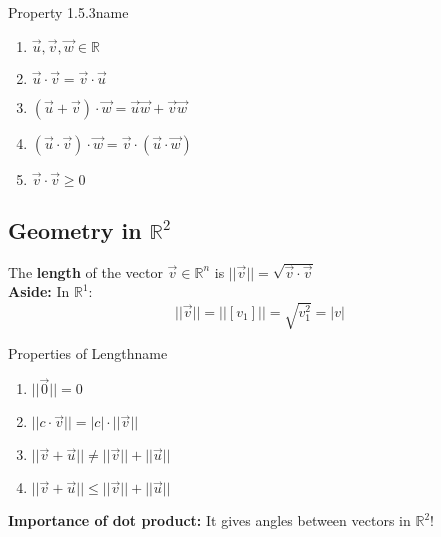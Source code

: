 \documentclass[11pt]{article}
\theoremstyle{plain}
\theoremstyle{remark}
\theoremstyle{plain}
\newcommand{\bd}{\textbf}
\newcommand{\rn}{\mathbb{R}}
\begin{document}
\begin{theo}{Property 1.5.3}{name}
    \begin{enumerate}
        \item $\overrightarrow{u},\overrightarrow{v}, \overrightarrow{w} \in \rn$
        \item $\overrightarrow{u}\cdot\overrightarrow{v} = \overrightarrow{v}\cdot\overrightarrow{u}$
        \item $(\overrightarrow{u}+\overrightarrow{v})\cdot\overrightarrow{w} = \overrightarrow{u}\overrightarrow{w}+\overrightarrow{v}\overrightarrow{w}$
        \item $(\overrightarrow{u}\cdot\overrightarrow{v})\cdot\overrightarrow{w} = \overrightarrow{v}\cdot(\overrightarrow{u}\cdot\overrightarrow{w})$
        \item $\overrightarrow{v}\cdot \overrightarrow{v}\geq 0$
    \end{enumerate}
\end{theo}

\subsection*{Geometry in $\rn^2$}
\begin{tcolorbox}[colback=green!5!white,colframe=green!75!black,title=Definition]
    The \bd{length} of the vector $\overrightarrow{v}\in \rn^n$ is $||\overrightarrow{v}|| = \sqrt{\overrightarrow{v}\cdot\overrightarrow{v}}$\\
    
    \bd{Aside:} In $\rn^1:$ \[||\overrightarrow{v}||=||[v_1]|| = \sqrt{v_1^2} = |v|\]
\end{tcolorbox}   
\begin{theo}{Properties of Length}{name}
    \begin{enumerate}
        \item $||\overrightarrow{0}|| = 0$
        \item $||c \cdot \overrightarrow{v}|| = |c|\cdot||\overrightarrow{v}||$
        \item $||\overrightarrow{v} + \overrightarrow{u}|| \neq ||\overrightarrow{v}|| + ||\overrightarrow{u}||$
        \item $||\overrightarrow{v} + \overrightarrow{u}||\leq ||\overrightarrow{v}|| + ||\overrightarrow{u}||$
    \end{enumerate}
\end{theo}

\bd{Importance of dot product:} It gives angles between vectors in $\rn^2$!
\end{document}
